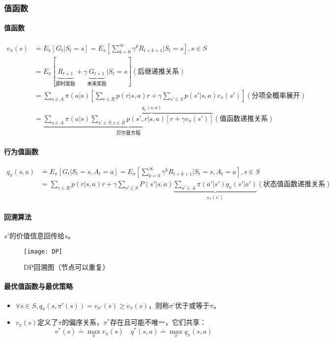 \documentclass[
12pt, %
a4paper, 
oneside, %
headinclude,footinclude, %
]{scrartcl}
\begin{document}
\subsubsection[值函数]{值函数}
\paragraph{值函数}
\begin{align*}
v_\pi(s) &\doteq E_\pi[G_t|S_t = s] = E_\pi[\sum_{k = 0}^{\infty} \gamma^k R_{t + k + 1}|S_t = s], s \in S \\
&= E_\pi[\underbrace{R_{t + 1}}_{\text{即时奖励}} + \gamma \underbrace{G_{t + 1}}_{\text{未来奖励}}|S_t = s] (\text{后继递推关系}) \\
&= \sum_{a \in A} \pi(a|s)[\sum_{r \in R} p(r|s, a)r + \gamma \sum_{s' \in S} p(s'|s, a)v_{\pi}(s')] (\text{分项全概率展开}) \\
&= \underbrace{\sum_{a \in A} \pi(a|s) \overbrace{\sum_{s' \in S, r \in R} p(s', r|s, a)[r + \gamma v_\pi(s')]}^{q_{\pi}(s, a)}}_{\text{贝尔曼方程}} (\text{值函数递推关系})
\end{align*}
\paragraph{行为值函数}
\begin{align*} 
q_\pi(s, a) &\doteq E_\pi[G_t|S_t = s, A_t = a] = E_\pi[\sum_{k = 0}^{\infty} \gamma^k R_{t + k + 1}|S_t = s, A_t = a], s \in S \\
&= \sum_{r \in R} p(r|s, a)r + \gamma \sum_{s' \in S} P(s'|s, a) \underbrace{\sum_{a' \in A} \pi(a'|s')q_{\pi}(s'|a')}_{v_{\pi}(s')} (\text{状态值函数递推关系})
\end{align*}
\paragraph{回溯算法}
$ s' $的价值信息回传给$ s $。

\begin{figure}[H]
\centering 
\texttt{[image: DP]} 
\caption{DP回溯图（节点可以重复）}
\end{figure}
\paragraph{最优值函数与最优策略}
\begin{itemize}
\item $ \forall s \in S, q_{\pi}(s, \pi'(s)) = v_{\pi'}(s) \geq v_{\pi}(s) $，则称$ \pi' $优于或等于$ \pi $。
\item $ v_\pi(s) $定义了$ \pi $的偏序关系，$ \pi^* $存在且可能不唯一，它们共享：
$$ v^*(s) \doteq \max_{\pi} v_{\pi}(s) \quad q^*(s, a) \doteq \max_{\pi} q_{\pi}(s, a) $$
\end{itemize}
\end{document}
